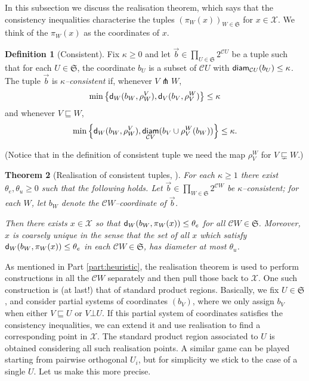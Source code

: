 \documentclass[11pt,oneside]{amsart}
\newtheorem{thm}{Theorem}[section]
\theoremstyle{definition}
\newtheorem{defn}[thm]{Definition}
\DeclareMathOperator{\diam}{\textup{\textsf{diam}}}
\newcommand{\tup}[1]{\vec{#1}}
\newcommand{\dist}{\textup{\textsf{d}}}
\newcommand{\cuco}[1]{{\mathcal #1}}
\newcommand{\fontact}{{\mathcal C}}
\newcommand{\nest}{\sqsubseteq}
\newcommand{\propnest}{\sqsubsetneq}
\newcommand{\orth}{\bot}
\newcommand{\transverse}{\pitchfork}
\begin{document}
In this subsection we discuss the realisation theorem, which says that the consistency inequalities characterise the tuples $(\pi_W(x))_{W\in\mathfrak S}$ for $x\in\cuco X$. We think of the $\pi_W(x)$ as the coordinates of $x$.


\begin{defn}[Consistent]\label{defn:consistent}
Fix $\kappa\geq0$ and let $\tup b\in\prod_{U\in\mathfrak S}2^{\fontact U}$ be a tuple such that for each $U\in\mathfrak S$, the coordinate $b_U$ is a subset of $\fontact U$ with $\diam_{\fontact U}(b_U)\leq\kappa$.  The tuple $\tup b$ is \emph{$\kappa$--consistent} if, whenever $V\transverse W$,
$$\min\left\{\dist_{ W}(b_W,\rho^V_W),\dist_{ V}(b_V,\rho^W_V)\right\}\leq\kappa$$
and whenever $V\nest W$, 
$$\min\left\{\dist_{ W}(b_W,\rho^V_W),\diam_{\fontact V}(b_V\cup\rho^W_V(b_W))\right\}\leq\kappa.$$
\end{defn}

(Notice that in the definition of consistent tuple we need the map $\rho^W_V$ for $V\propnest W$.)

\begin{thm}[{Realisation of consistent tuples, \cite[Theorem 3.1]{HHS2}}]\label{thm:realization}
 For each $\kappa\geq1$ there exist $\theta_e,\theta_u\geq0$ such that
 the following holds.  Let $\tup
 b\in\prod_{W\in\mathfrak S}2^{\fontact W}$ be $\kappa$--consistent;
 for each $W$, let $b_W$ denote the $\fontact W$--coordinate of $\tup
 b$.

 Then there exists $x\in \cuco X$ so that $\dist_{
 W}(b_W,\pi_W(x))\leq\theta_e$ for all $\fontact W\in\mathfrak S$.
 Moreover, $x$ is \emph{coarsely unique} in the sense that the set of
 all $x$ which satisfy $\dist_{ W}(b_W,\pi_W(x))\leq\theta_e$ in each
 $\fontact W\in\mathfrak S$, has diameter at most $\theta_u$.
\end{thm}


As mentioned in Part \ref{part:heuristic}, the realisation theorem is used to perform constructions in all the $\fontact W$ separately and then pull those back to $\cuco X$. One such construction is (at last!) that of standard product regions. Basically, we fix $U\in \mathfrak S$, and consider partial systems of coordinates $(b_V)$, where we only assign $b_V$ when either $V\nest U$ or $V\orth U$. If this partial system of coordinates satisfies the consistency inequalities, we can extend it and use realisation to find a corresponding point in $\cuco X$. The standard product region associated to $U$ is obtained considering all such realisation points. A similar game can be played starting from pairwise orthogonal $U_i$, but for simplicity we stick to the case of a single $U$. Let us make this more precise.
\end{document}
